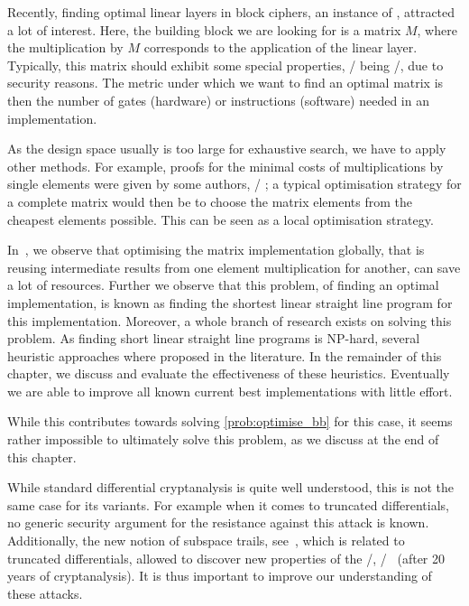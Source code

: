 Recently, finding optimal linear layers in block ciphers, an instance of , attracted a lot of interest.
Here, the building block we are looking for is a matrix $M$, where the multiplication by $M$ corresponds to the application of the linear layer.
Typically, this matrix should exhibit some special properties, \eg/ being \MDS/, due to security reasons.
The metric under which we want to find an optimal matrix is then the number of gates (hardware) or instructions (software) needed in an implementation.

As the design space usually is too large for exhaustive search, we have to apply other methods.
For example, proofs for the minimal costs of multiplications by single elements were given by some authors, \eg/ \textcite{C:BeiKraLea16,EC:Kolsch19}; a typical optimisation strategy for a complete matrix would then be to choose the matrix elements from the cheapest elements possible.
This can be seen as a local optimisation strategy.

In~\cite{ToSC:KLSW17}, we observe that optimising the matrix implementation globally, that is reusing intermediate results from one element multiplication for another, can save a lot of resources.
Further we observe that this problem, of finding an optimal implementation, is known as finding the shortest linear straight line program for this implementation.
Moreover, a whole branch of research exists on solving this problem.
As finding short linear straight line programs is NP-hard, several heuristic approaches where proposed in the literature.
In the remainder of this chapter, we discuss and evaluate the effectiveness of these heuristics.
Eventually we are able to improve all known current best implementations with little effort.

While this contributes towards solving \cref{prob:optimise_bb} for this case, it seems rather impossible to ultimately solve this problem, as we discuss at the end of this chapter.

While standard differential cryptanalysis is quite well understood, this is not the same case for its variants.
For example when it comes to truncated differentials, no generic security argument for the resistance against this attack is known.
Additionally, the new notion of subspace trails, see~\cite{ToSC:GraRecRon16}, which is related to truncated differentials, allowed to discover new properties of the \AES/, \eg/~ (after 20 years of cryptanalysis).
It is thus important to improve our understanding of these attacks.

